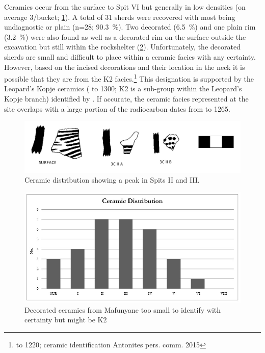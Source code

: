 \documentclass{ijsra}
\begin{document}
Ceramics occur from the  surface to Spit VI but generally in low densities (on average 3/bucket; \cref{fig:Forssman-Figure07}). 
A total of 31 sherds were recovered with most being undiagnostic or plain 
(n=28; \SI{90.3}{\percent}). 
Two decorated (\SI{6.5}{\percent}) and one plain rim (\SI{3.2}{\percent}) were also found as well as a decorated rim on the surface outside the excavation but still within the rockshelter (\cref{fig:Forssman-Figure08}). 
Unfortunately, the decorated sherds are small and difficult to place within a ceramic facies with any certainty. However, based on the incised decorations and their location in the neck it is possible that they are from the K2 facies.\footnote{ to 1220; ceramic identification Antonites pers. comm. 2015} 
This designation is supported by the Leopard’s Kopje ceramics ( to 1300; K2 is a sub-group within the Leopard’s Kopje branch) identified by \textcite{Walker_1994}. 
If accurate, the ceramic facies represented at the site overlaps with a large portion of the radiocarbon dates from  to 1265.

	\begin{figure} %
		\includegraphics[width=\linewidth]{figures/Forssman-Figure07}
		\caption{Ceramic distribution showing a peak in Spits II and III.}
		\label{fig:Forssman-Figure07}
	\end{figure}
	
		\begin{figure} %
			\includegraphics[width=\linewidth]{figures/Forssman-Figure08}
			\caption{Decorated ceramics from Mafunyane too small to identify with certainty but might be K2}
			\label{fig:Forssman-Figure08}
		\end{figure}
\end{document}
